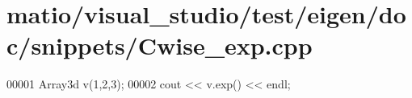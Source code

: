 \hypertarget{matio_2visual__studio_2test_2eigen_2doc_2snippets_2_cwise__exp_8cpp_source}{}\section{matio/visual\+\_\+studio/test/eigen/doc/snippets/\+Cwise\+\_\+exp.cpp}
\label{matio_2visual__studio_2test_2eigen_2doc_2snippets_2_cwise__exp_8cpp_source}

\begin{DoxyCode}
00001 Array3d v(1,2,3);
00002 cout << v.exp() << endl;
\end{DoxyCode}
